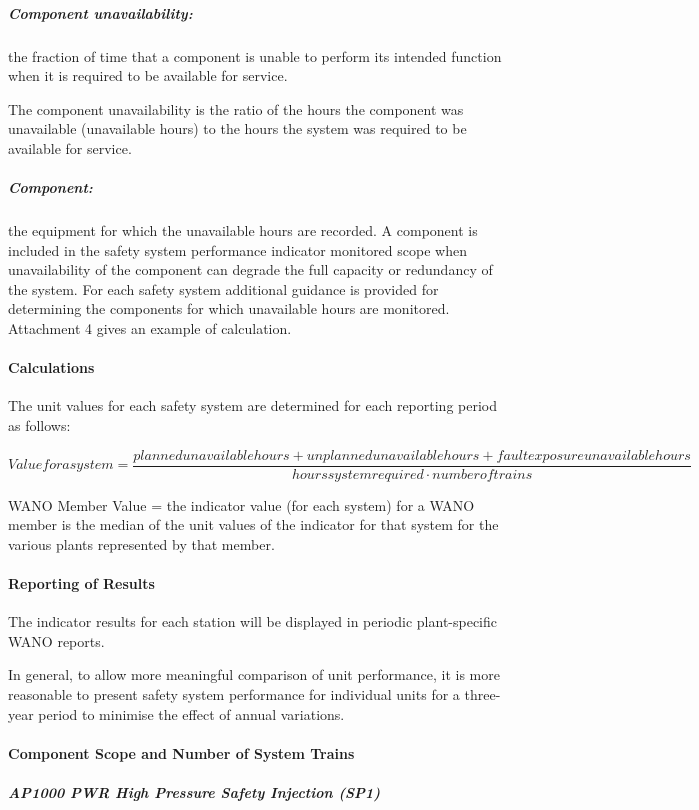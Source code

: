 \subparagraph{Component unavailability:} the fraction of time that a
component is unable to perform its intended function when it is
required to be available for service.

The component unavailability is the ratio of the hours the component
was unavailable (unavailable hours) to the hours the system was
required to be available for service.

\subparagraph{Component:} the equipment for which the unavailable hours are recorded.
A component is included in the safety system performance indicator
monitored scope when unavailability of the component can degrade the
full capacity or redundancy of the system. For each safety system
additional guidance is provided for determining the components for
which unavailable hours are monitored. Attachment 4 gives an example
of calculation.

\paragraph{Calculations}

The unit values for each safety system are determined for each
reporting period as follows:

$$ Value for a system = \frac{planned unavailable hours+unplanned unavailable hours+fault
exposure unavailable hours}{hours system required \cdot number of trains} $$

WANO Member Value = the indicator value (for each system) for a WANO
member is the median of the unit values of the indicator for that
system for the various plants represented by that member.

\paragraph{Reporting of Results}

The indicator results for each station will be displayed in periodic
plant-specific WANO reports.

In general, to allow more meaningful comparison of unit performance,
it is more reasonable to present safety system performance for
individual units for a three-year period to minimise the effect of
annual variations.

\paragraph{Component Scope and Number of System Trains}

\subparagraph{AP1000 PWR High Pressure Safety Injection (SP1)}

